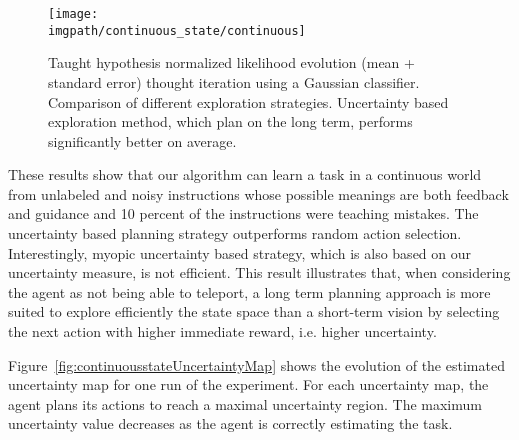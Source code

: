 \begin{figure}[!htbp]
  \centering
  \texttt{[image: \\imgpath/continuous\_state/continuous]}
  \caption{Taught hypothesis normalized likelihood evolution (mean + standard error) thought iteration using a Gaussian classifier. Comparison of different exploration strategies. Uncertainty based exploration method, which plan on the long term, performs significantly better on average.}
  \label{fig:continuousstateRmax}
\end{figure}

These results show that our algorithm can learn a task in a continuous world from unlabeled and noisy instructions whose possible meanings are both feedback and guidance and 10 percent of the instructions were teaching mistakes. The uncertainty based planning strategy outperforms random action selection. Interestingly, myopic uncertainty based strategy, which is also based on our uncertainty measure, is not efficient. This result illustrates that, when considering the agent as not being able to teleport, a long term planning approach is more suited to explore efficiently the state space than a short-term vision by selecting the next action with higher immediate reward, i.e. higher uncertainty. 


Figure~\ref{fig:continuousstateUncertaintyMap} shows the evolution of the estimated uncertainty map for one run of the experiment. For each uncertainty map, the agent plans its actions to reach a maximal uncertainty region. The maximum uncertainty value decreases as the agent is correctly estimating the task.

